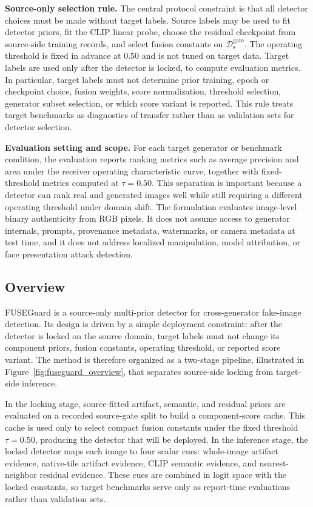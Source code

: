\documentclass[letterpaper,journal]{IEEEtran}
\begin{document}
\textbf{Source-only selection rule.}
The central protocol constraint is that all detector choices must be made without target labels. Source labels may be used to fit detector priors, fit the CLIP linear probe, choose the residual checkpoint from source-side training records, and select fusion constants on $\mathcal{D}_{\mathrm{s}}^{\mathrm{gate}}$. The operating threshold is fixed in advance at $0.50$ and is not tuned on target data. Target labels are used only after the detector is locked, to compute evaluation metrics. In particular, target labels must not determine prior training, epoch or checkpoint choice, fusion weights, score normalization, threshold selection, generator subset selection, or which score variant is reported. This rule treats target benchmarks as diagnostics of transfer rather than as validation sets for detector selection.

\textbf{Evaluation setting and scope.}
For each target generator or benchmark condition, the evaluation reports ranking metrics such as average precision and area under the receiver operating characteristic curve, together with fixed-threshold metrics computed at $\tau=0.50$. This separation is important because a detector can rank real and generated images well while still requiring a different operating threshold under domain shift. The formulation evaluates image-level binary authenticity from RGB pixels. It does not assume access to generator internals, prompts, provenance metadata, watermarks, or camera metadata at test time, and it does not address localized manipulation, model attribution, or face presentation attack detection.

\subsection{Overview}
\label{sec:method_overview}

FUSEGuard is a source-only multi-prior detector for cross-generator fake-image detection. Its design is driven by a simple deployment constraint: after the detector is locked on the source domain, target labels must not change its component priors, fusion constants, operating threshold, or reported score variant. The method is therefore organized as a two-stage pipeline, illustrated in Figure~\ref{fig:fuseguard_overview}, that separates source-side locking from target-side inference.

In the locking stage, source-fitted artifact, semantic, and residual priors are evaluated on a recorded source-gate split to build a component-score cache. This cache is used only to select compact fusion constants under the fixed threshold $\tau=0.50$, producing the detector that will be deployed. In the inference stage, the locked detector maps each image to four scalar cues: whole-image artifact evidence, native-tile artifact evidence, CLIP semantic evidence, and nearest-neighbor residual evidence. These cues are combined in logit space with the locked constants, so target benchmarks serve only as report-time evaluations rather than validation sets.
\end{document}
